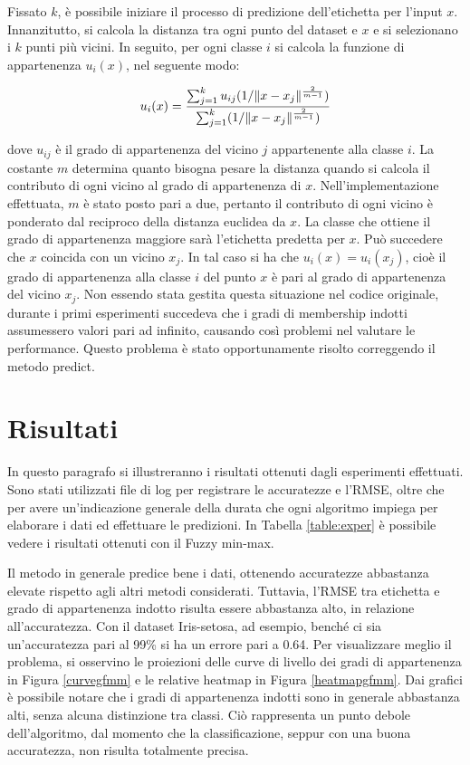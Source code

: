 \documentclass[11pt,  oneside, openany]{book}
\begin{document}
Fissato $k$, è possibile iniziare il processo di predizione dell'etichetta per l'input $x$. Innanzitutto, si calcola la distanza tra ogni punto del dataset e $x$ e si selezionano i $k$ punti più vicini. In seguito, per ogni classe $i$ si calcola la funzione di appartenenza $u_{i}(x)$, nel seguente modo: 

\begin{equation} \label{eq:2}
u_{i}(x) = {\sum_{j=1}^k u_{ij}({1 / \Vert x-x_j\Vert^{\frac{2}{m-1}}}) \over \sum_{j=1}^k ({1 / \Vert x-x_j\Vert^{\frac{2}{m-1}}}) }
\end{equation}

\noindent dove $u_{ij}$ è il grado di appartenenza del vicino $j$ appartenente alla classe $i$. La costante $m$ determina quanto bisogna pesare la distanza quando si calcola il contributo di ogni vicino al grado di appartenenza di $x$. Nell'implementazione effettuata, $m$ è stato posto pari a due, pertanto il contributo di ogni vicino è ponderato dal reciproco della distanza euclidea da $x$. La classe che ottiene il grado di appartenenza maggiore sarà l'etichetta predetta per $x$. Può succedere che $x$ coincida con un vicino $x_j$. In tal caso si ha che $u_i(x) = u_i(x_j) $, cioè il grado di appartenenza alla classe $i$ del punto $x$ è pari al grado di appartenenza del vicino $x_j$. Non essendo stata gestita questa situazione nel codice originale, durante i primi esperimenti succedeva che i gradi di membership indotti assumessero valori pari ad infinito, causando così problemi nel valutare le performance. Questo problema è stato opportunamente risolto correggendo il metodo predict. 


	\section{Risultati}


In questo paragrafo si illustreranno i risultati ottenuti dagli esperimenti effettuati. Sono stati utilizzati file di log per registrare le accuratezze e l'RMSE, oltre che per avere un'indicazione generale della durata che ogni algoritmo impiega per elaborare i dati ed effettuare le predizioni. In Tabella \ref{table:exper} è possibile vedere i risultati ottenuti con il Fuzzy min-max. 

Il metodo in generale predice bene i dati, ottenendo accuratezze abbastanza elevate rispetto agli altri metodi considerati. Tuttavia, l'RMSE tra etichetta e grado di appartenenza indotto risulta essere abbastanza alto, in relazione all'accuratezza. Con il dataset Iris-setosa, ad esempio, benché ci sia un'accuratezza pari al 99\% si ha un errore pari a 0.64. Per visualizzare meglio il problema, si osservino le proiezioni delle curve di livello dei gradi di appartenenza in Figura \ref{curvegfmm} e le relative heatmap in Figura \ref{heatmapgfmm}. 
Dai grafici è possibile notare che i gradi di appartenenza indotti sono in generale abbastanza alti, senza alcuna distinzione tra classi. Ciò rappresenta un punto debole dell'algoritmo, dal momento che la classificazione, seppur con una buona accuratezza, non risulta totalmente precisa. 
\end{document}
